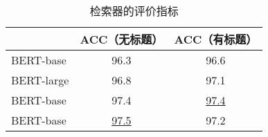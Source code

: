 \begin{table}[htbp]
    \centering
    \caption{检索器的评价指标}
    \begin{tabular}{lcc}
    \hline
    & ACC（无标题） & ACC（有标题） \\
    \hline
    BERT-base & 96.3 & 96.6 \\
    BERT-large & 96.8 & 97.1 \\
    BERT-base & 97.4 & \underline{97.4} \\
    BERT-base & \underline{97.5} & 97.2 \\
    \hline
    \end{tabular}
    \label{tab:5-5}
\end{table}
